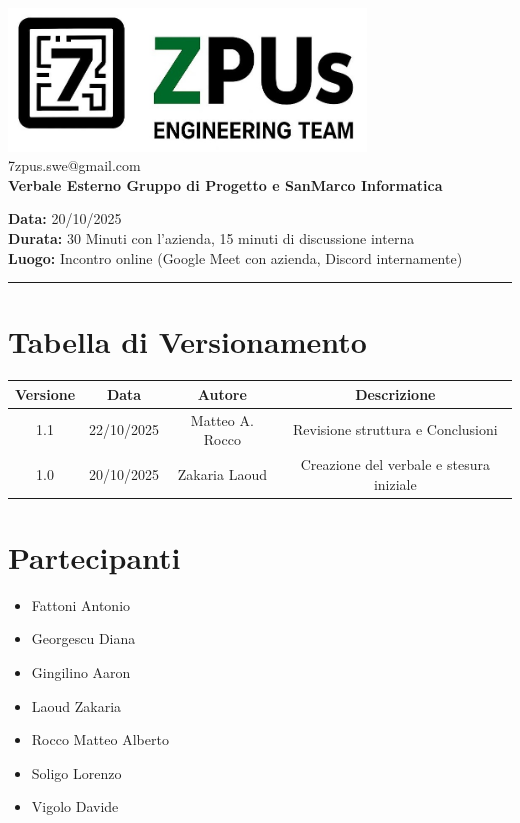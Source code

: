 \documentclass[a4paper,12pt]{article}
\begin{document}
\begin{center}
    \includegraphics[width=9.5cm]{../../../assets/logo7zpus.jpg}\\
    \small\hspace{10cm} 7zpus.swe@gmail.com\\
    \Large \textbf{Verbale Esterno Gruppo di Progetto e SanMarco Informatica}\\
    \vspace{0.5cm}
\end{center}


\noindent
\textbf{Data:} 20/10/2025 \\
\textbf{Durata:} 30 Minuti con l'azienda, 15 minuti di discussione interna \\
\textbf{Luogo:} Incontro online (Google Meet con azienda, Discord internamente)

\vspace{0.3cm}
\hrule
\vspace{0.5cm}

\tableofcontents

\newpage

\section{Tabella di Versionamento}
    \begin{tabular}{|c|c|c|c|}
        \hline
        \textbf{Versione} & \textbf{Data} & \textbf{Autore} & \textbf{Descrizione} \\
        \hline
        1.1 & 22/10/2025 & Matteo A. Rocco & Revisione struttura e Conclusioni \\
        \hline
        1.0 & 20/10/2025 & Zakaria Laoud & Creazione del verbale e stesura iniziale \\
        \hline
    \end{tabular}


\section{Partecipanti}
\begin{itemize}[noitemsep]
    \item Fattoni Antonio 
    \item Georgescu Diana
    \item Gingilino Aaron
    \item Laoud Zakaria
    \item Rocco Matteo Alberto
    \item Soligo Lorenzo
    \item Vigolo Davide
\end{itemize}
\end{document}
